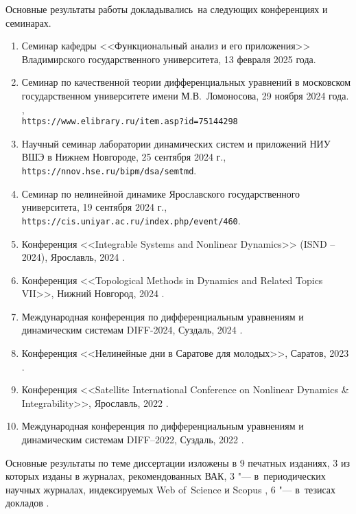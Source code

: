 {\probation}
Основные результаты работы докладывались~на следующих конференциях и семинарах.
\begin{enumerate}
	\item Семинар кафедры <<Функциональный анализ и его приложения>> Владимирского государственного университета, 13 февраля 2025 года.
	\item Семинар по качественной теории дифференциальных уравнений в московском государственном университете имени М.В.~Ломоносова, 29 ноября 2024 года. \cite{Sergeev2024},\\\texttt{https://www.elibrary.ru/item.asp?id=75144298}
	\item Научный семинар лаборатории динамических систем и приложений НИУ ВШЭ в Нижнем Новгороде, 25 сентября 2024 г.,\\\texttt{https://nnov.hse.ru/bipm/dsa/semtmd}.
	\item Семинар по нелинейной динамике Ярославского государственного университета, 19 сентября 2024 г.,\\\texttt{https://cis.uniyar.ac.ru/index.php/event/460}.
	\item Конференция <<Integrable Systems and Nonlinear Dynamics>> (ISND – 2024), Ярославль, 2024 \cite{confbib5}.
	\item Конференция <<Topological Methods in Dynamics and Related Topics VII>>, Нижний Новгород, 2024 \cite{confbib6}.
	\item Международная конференция по дифференциальным уравнениям и динамическим системам DIFF-2024, Суздаль, 2024 \cite{confbib3}.
	\item Конференция <<Нелинейные дни в Саратове для молодых>>, Саратов, 2023 \cite{confbib2}.
	\item Конференция <<Satellite International Conference on Nonlinear Dynamics {\&} Integrability>>, Ярославль, 2022 \cite{confbib4}.
	\item Международная конференция по дифференциальным уравнениям и динамическим системам DIFF--2022, Суздаль, 2022 \cite{confbib1}.
\end{enumerate}



\bigskip

{\publications} Основные результаты по теме диссертации изложены в 9 печатных изданиях, 3 из которых \cite{wosbib1,wosbib2,scbib1} изданы в журналах, рекомендованных ВАК, 3 "--- в~периодических научных журналах, индексируемых Web of~Science и Scopus \cite{wosbib1,wosbib2,scbib1}, 6 "--- в~тезисах докладов \cite{confbib1,confbib2,confbib3,confbib4,confbib5,confbib6}.

